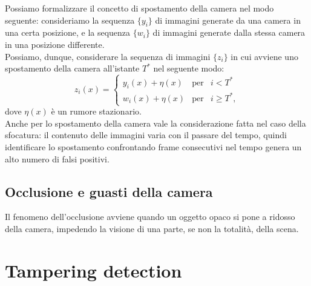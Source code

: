Possiamo formalizzare il concetto di spostamento della camera nel modo seguente: consideriamo la sequenza $\{y_i\}$ di immagini generate da una camera in una certa posizione, e la sequenza $\{w_i\}$ di immagini generate dalla stessa camera in una posizione differente.\\
Possiamo, dunque, considerare la sequenza di immagini $\{z_i\}$ in cui avviene uno spostamento della camera all'istante $T^*$ nel seguente modo:
\begin{equation}
\label{eq:displacement}
z_i(x) = \left\{ \begin{array}{rcl}
	y_i(x) + \eta(x) & \mbox{per} & i < T^* \\
	w_i(x) + \eta(x) & \mbox{per} & i \geqslant T^*,
	\end{array}\right.
\end{equation}
dove $\eta(x)$ \`e un rumore stazionario.\\
Anche per lo spostamento della camera vale la considerazione fatta nel caso della sfocatura: il contenuto delle immagini varia con il passare del tempo, quindi identificare lo spostamento confrontando frame consecutivi nel tempo genera un alto numero di falsi positivi.
\subsection{Occlusione e guasti della camera}
Il fenomeno dell'occlusione avviene quando un oggetto opaco si pone a ridosso della camera, impedendo la visione di una parte, se non la totalit\`a, della scena. 
\section{Tampering detection}
